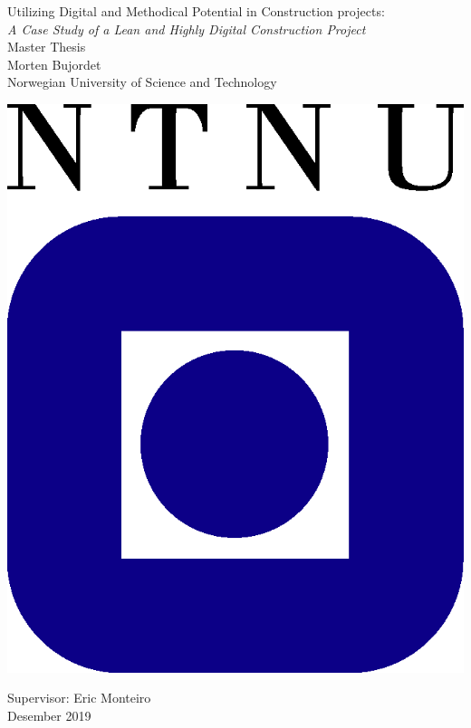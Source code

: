 \clearpage
\begin{titlepage}
    \begin{center}
    
        {\Huge Utilizing Digital and Methodical Potential in Construction projects:} \\{\Huge\textit{A Case Study of a Lean and Highly Digital Construction Project}} \\[0.4cm]
    
        {\Large Master Thesis} \\[2.0cm]
        {\Large Morten Bujordet} \\ [0.5cm]
        {\Large Norwegian University of Science and Technology}\\
    
        \vspace{3.0cm}
    
                \includegraphics{fig/ntnu-logo2.png}
    
        \vspace{3.0cm}
    
        {\Large Supervisor: Eric Monteiro} \\ [0.2cm]
        {\Large Desember 2019} \\[0.2cm]
    \end{center}
\end{titlepage}
\cleardoublepage
